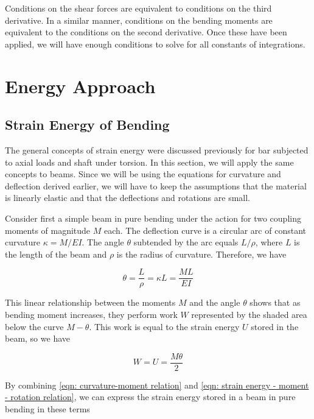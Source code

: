 \documentclass[
10pt,
a4paper,
openany,
svgnames,
]{kaobook} %
\begin{document}
Conditions on the shear forces are equivalent to conditions on the third derivative. In a similar manner, conditions on the bending moments are equivalent to the conditions on the second derivative. Once these have been applied, we will have enough conditions to solve for all constants of integrations.

\section{Energy Approach}

\subsection{Strain Energy of Bending}

The general concepts of strain energy were discussed previously for bar subjected to axial loads and shaft under torsion. In this section, we will apply the same concepts to beams. Since we will be using the equations for curvature and deflection derived earlier, we will have to keep the assumptions that the material is linearly elastic and that the deflections and rotations are small.

Consider first a simple beam in pure bending under the action for two coupling moments of magnitude $M$ each. The deflection curve is a circular arc of constant curvature $\kappa = M/EI$. The angle $\theta$ subtended by the arc equals $L/\rho$, where $L$ is the length of the beam and $\rho$ is the radius of curvature. Therefore, we have

\begin{equation} \label{eqn: curvature-moment relation}
  \theta  = \frac{L}{\rho } = \kappa L = \frac{ML}{EI}
\end{equation}

This linear relationship between the moments $M$ and the angle $\theta$ shows that as bending moment increases, they perform work $W$ represented by the shaded area below the curve $M-\theta$. This work is equal to the strain energy $U$ stored in the beam, so we have

\begin{equation} \label{eqn: strain energy - moment - rotation relation}
  W = U = \frac{M\theta}{2}
\end{equation}

By combining \cref{eqn: curvature-moment relation} and \cref{eqn: strain energy - moment - rotation relation}, we can express the strain energy stored in a beam in pure bending in these terms
\end{document}
